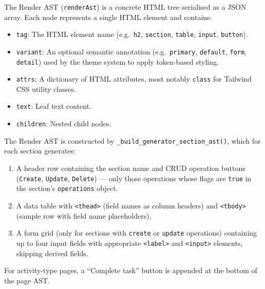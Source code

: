 The Render AST (\texttt{renderAst}) is a concrete HTML tree serialised as a JSON array. Each node represents a single HTML element and contains:

\begin{itemize}
    \item \texttt{tag}: The HTML element name (e.g.\ \texttt{h2}, \texttt{section}, \texttt{table}, \texttt{input}, \texttt{button}).
    \item \texttt{variant}: An optional semantic annotation (e.g.\ \texttt{primary}, \texttt{default}, \texttt{form}, \texttt{detail}) used by the theme system to apply token-based styling.
    \item \texttt{attrs}: A dictionary of HTML attributes, most notably \texttt{class} for Tailwind CSS utility classes.
    \item \texttt{text}: Leaf text content.
    \item \texttt{children}: Nested child nodes.
\end{itemize}

The Render AST is constructed by \texttt{\_build\_generator\_section\_ast()}, which for each section generates:

\begin{enumerate}
    \item A header row containing the section name and CRUD operation buttons (\texttt{Create}, \texttt{Update}, \texttt{Delete}) — only those operations whose flags are \texttt{true} in the section's \texttt{operations} object.
    \item A data table with \texttt{<thead>} (field names as column headers) and \texttt{<tbody>} (sample row with field name placeholders).
    \item A form grid (only for sections with \texttt{create} or \texttt{update} operations) containing up to four input fields with appropriate \texttt{<label>} and \texttt{<input>} elements, skipping derived fields.
\end{enumerate}

For activity-type pages, a ``Complete task'' button is appended at the bottom of the page AST.

